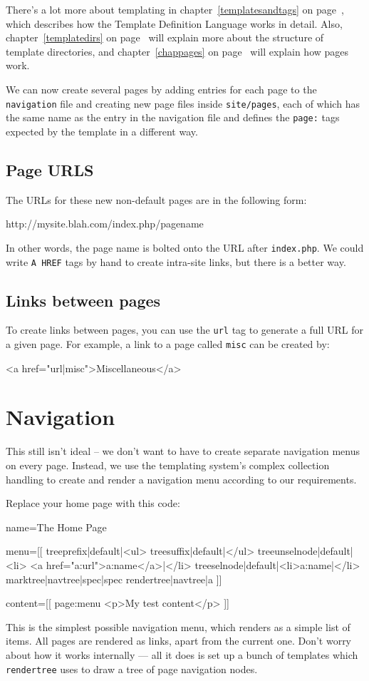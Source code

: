 There's a lot more about templating in chapter~\ref{templatesandtags} on page~\pageref{templatesandtags},
which describes how the Template Definition Language works in detail. Also, chapter~\ref{templatedirs}
on page~\pageref{templatedirs} will explain more about the structure of template directories,
and chapter~\ref{chappages} on page~\pageref{chappages} will explain how pages work.

We can now create several pages by adding entries for each page to the \texttt{navigation} file
and creating new page files inside \texttt{site/pages}, each of which has the same name as the entry
in the navigation file and defines the \texttt{page:} tags expected by the template in a different way.

\subsection{Page URLS}
The URLs for these new non-default pages are in the following form:
\begin{MyVerbatim}
http://mysite.blah.com/index.php/pagename
\end{MyVerbatim}
In other words, the page name is bolted onto the URL after \texttt{index.php}.
We could write \texttt{A HREF} tags by hand to create intra-site links, but
there is a better way.

\subsection{Links between pages}
To create links between pages, you can use the \texttt{url} tag to generate a full URL for a given
page. For example, a link to a page called \texttt{misc} can be created by:
\begin{MyVerbatim}
<a href="{{url|misc}}">Miscellaneous</a>
\end{MyVerbatim}

\section{Navigation}
This still isn't ideal -- we don't want to have to create separate navigation menus on every 
page. Instead, we use the templating system's complex collection handling to create and render
a navigation menu according to our requirements.

Replace your home page with this code:
\begin{MyVerbatim}
name=The Home Page

menu=[[
    {{treeprefix|default|<ul>}}
    {{treesuffix|default|</ul>}}
    {{treeunselnode|default|<li>
        <a href="{{a:url}}">{{a:name}}</a>|</li>}}
    {{treeselnode|default|<li>{{a:name}}|</li>}}
    {{marktree|{{navtree}}|spec|{{spec}}}}
    {{rendertree|{{navtree}}|a}}
]]

content=[[
{{page:menu}}
<p>My test content</p>
]]
\end{MyVerbatim}
This is the simplest possible navigation menu, which renders as a simple list of items. All pages
are rendered as links, apart from the current one. Don't worry about how it works internally ---
all it does is set up a bunch of templates which \texttt{rendertree} uses to draw a tree of page
navigation nodes.

